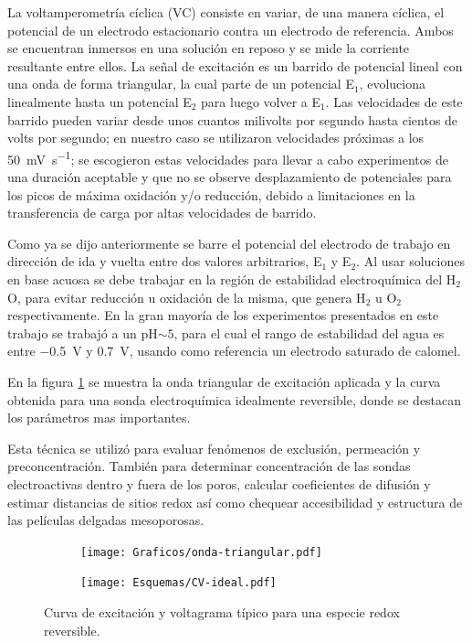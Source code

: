 	 		La voltamperometría cíclica (VC) consiste en variar, de una manera cíclica, el potencial de un electrodo estacionario contra un electrodo de referencia. Ambos se encuentran inmersos en una solución en reposo y se mide la corriente resultante entre ellos. La señal de excitación es un barrido de potencial lineal con una onda de forma triangular, la cual parte de un potencial E$_1$, evoluciona linealmente hasta un potencial E$_2$ para luego volver a E$_1$. Las velocidades de este barrido pueden variar desde unos cuantos milivolts por segundo hasta cientos de volts por segundo; en nuestro caso se utilizaron velocidades próximas a los \SI{50}{\milli\volt.\second^{-1}}; se escogieron estas velocidades para llevar a cabo experimentos de una duración aceptable y que no se observe desplazamiento de potenciales para los picos de máxima oxidación y/o reducción, debido a limitaciones en la transferencia de carga por altas velocidades de barrido. \cite{nicholson1964,Gewirth2004}

	 		Como ya se dijo anteriormente se barre el potencial del electrodo de trabajo en dirección de ida y vuelta entre dos valores arbitrarios, E$_1$ y E$_2$. Al usar soluciones en base acuosa se debe trabajar en la región de estabilidad electroquímica del H$_2$O, para evitar reducción u oxidación de la misma, que genera H$_2$ u O$_2$ respectivamente. En la gran mayoría de los experimentos presentados en este trabajo se trabajó a un pH$\sim 5$, para el cual el rango de estabilidad del agua es entre \SI{-0.5}{\volt} y \SI{0.7}{\volt}, usando como referencia un electrodo saturado de calomel.\cite{wang2014} 

	 		En la figura \ref{fig:CV_ideal} se muestra la onda triangular de excitación aplicada y la curva obtenida para una sonda electroquímica idealmente reversible, donde se destacan los parámetros mas importantes.
	 		
	 		Esta técnica se utilizó para evaluar fenómenos de exclusión, permeación y preconcentración. También para determinar concentración de las sondas electroactivas dentro y fuera de los poros, calcular coeficientes de difusión y estimar distancias de sitios redox así como chequear accesibilidad y estructura de las películas delgadas mesoporosas.

	 			 \begin{figure}[ht]
			  		  \begin{subfigure}[t]{0.495\textwidth}
			  		  \texttt{[image: Graficos/onda-triangular.pdf]}
			  		  \end{subfigure}
			  		  \begin{subfigure}[t]{0.495\textwidth}
			  		  \texttt{[image: Esquemas/CV-ideal.pdf]}
			  		  \end{subfigure}
			  		  \caption[Voltamperometria ideal reversible]{Curva de excitación y voltagrama típico para una especie redox reversible.}
			  		  \label{fig:CV_ideal}
			  		  \end{figure}

